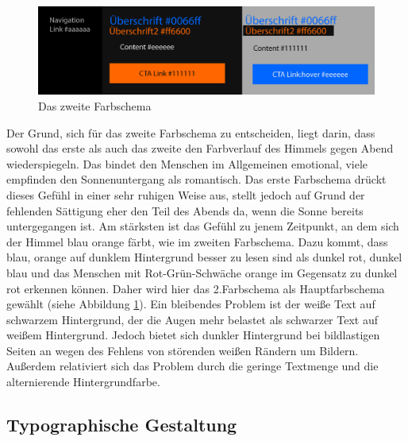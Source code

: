 \begin{figure} [h]
\includegraphics[width=\textwidth]{./img/inno_col2.png}
\caption{Das zweite Farbschema}
\label{inno_Farbschemen2}
\end{figure}

Der Grund, sich für das zweite Farbschema zu entscheiden, liegt darin, dass sowohl das erste als auch das zweite den Farbverlauf des Himmels gegen Abend wiederspiegeln. Das bindet den Menschen im Allgemeinen emotional, viele empfinden den Sonnenuntergang als romantisch. Das erste Farbschema drückt dieses Gefühl in einer sehr ruhigen Weise aus, stellt jedoch auf Grund der fehlenden Sättigung eher den Teil des Abends da, wenn die Sonne bereits untergegangen ist. Am stärksten ist das Gefühl zu jenem Zeitpunkt, an dem sich der Himmel blau orange färbt, wie im zweiten Farbschema. Dazu kommt, dass blau, orange auf dunklem Hintergrund besser zu lesen sind als dunkel rot, dunkel blau und das Menschen mit Rot-Grün-Schwäche orange im Gegensatz zu dunkel rot erkennen können. Daher wird hier das 2.Farbschema als Hauptfarbschema gewählt (siehe Abbildung \ref{inno_Farbschemen2}).
Ein bleibendes Problem ist der weiße Text auf schwarzem Hintergrund, der die Augen mehr belastet als schwarzer Text auf weißem Hintergrund. Jedoch bietet sich dunkler Hintergrund bei bildlastigen Seiten an wegen des Fehlens von störenden weißen Rändern um Bildern. Außerdem relativiert sich das Problem durch die geringe Textmenge und die alternierende Hintergrundfarbe.


	\subsection{Typographische Gestaltung} 
	\label{typo_inno}

